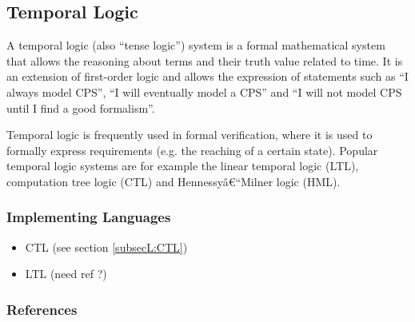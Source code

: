 




\subsection{Temporal Logic}
\label{subsecF:CTLSpecification}


A temporal logic (also ``tense logic'') system is a formal mathematical system that allows the reasoning about terms and their truth value related to time. It is an extension of first-order logic and allows the expression of statements such as ``I always model CPS'', ``I will eventually model a CPS'' and ``I will not model CPS until I find a good formalism''. 

Temporal logic is frequently used in formal verification, where it is used to formally express requirements (e.g. the reaching of a certain state).
Popular temporal logic systems are for example the linear temporal logic (LTL), computation tree logic (CTL) and Hennessyâ€“Milner logic (HML).

\subsubsection{Implementing Languages}

\begin{itemize}
	\item CTL (see section \ref{subsecL:CTL})
	\item LTL (need ref ?)
\end{itemize}


\subsubsection{References}

